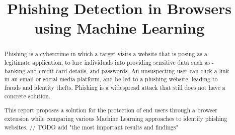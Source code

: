\documentclass[conference]{IEEEtran}
\begin{document}
\title{Phishing Detection in Browsers \linebreak using Machine Learning\\
}

\author{
    \and

}

\maketitle

\begin{abstract}

    Phishing is a cybercrime in which a target visits a website that is posing as a legitimate application, to lure individuals into providing sensitive data such as - banking and credit card details, and passwords.
    An unsuspecting user can click a link in an email or social media platform, and be led to a phishing website, leading to frauds and identity thefts.
    Phishing is a widespread attack that still does not have a concrete solution.
    \par This report proposes a solution for the protection of end users through a browser extension while comparing various Machine Learning approaches to identify phishing websites.
    // TODO add "the most important results and findings"
\end{abstract}

\end{document}
